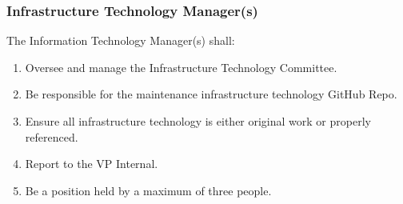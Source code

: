 \subsubsection{Infrastructure Technology Manager(s)}
\label{infrastructure-technology-managers}
The Information Technology Manager(s) shall:

\begin{enumerate}
 \item    
  Oversee and manage the Infrastructure Technology Committee. 
 \item    
  Be responsible for the maintenance infrastructure technology GitHub Repo. 
 \item     
  Ensure all infrastructure technology is either original work or properly referenced. 
 \item     
  Report to the VP Internal. 
 \item    
  Be a position held by a maximum of three people. 
  
\end{enumerate}